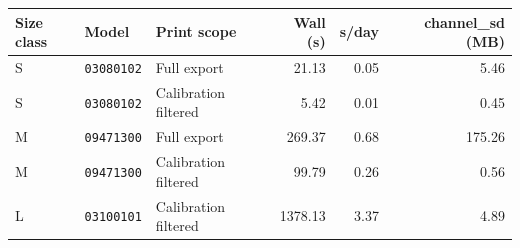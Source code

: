\begin{tabular*}{\textwidth}{@{\extracolsep{\fill}}lllrrr@{}}
\toprule
Size class & Model & Print scope & Wall (s) & s/day & channel\_sd (MB) \\
\midrule
S & \texttt{03080102} & Full export & 21.13 & 0.05 & 5.46 \\
S & \texttt{03080102} & Calibration filtered & 5.42 & 0.01 & 0.45 \\
M & \texttt{09471300} & Full export & 269.37 & 0.68 & 175.26 \\
M & \texttt{09471300} & Calibration filtered & 99.79 & 0.26 & 0.56 \\
L & \texttt{03100101} & Calibration filtered & 1378.13 & 3.37 & 4.89 \\
\bottomrule
\end{tabular*}
